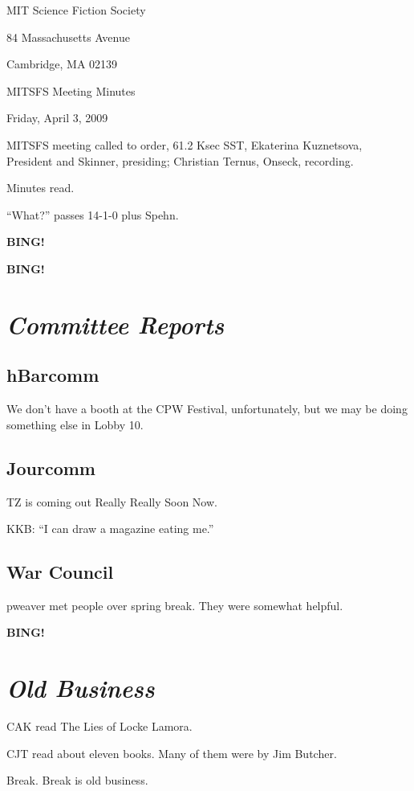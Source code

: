 \documentclass[10pt]{article}
\newcommand{\bing}{{\bf BING!} }
\newcommand{\goto}[1]{\bing \vskip 12pt \section*{{\em{#1}}}}
\newcommand{\ps}{ plus Spehn\xspace}
\begin{document}
\begin{center}

MIT Science Fiction Society

84 Massachusetts Avenue

Cambridge, MA 02139

\vspace{12pt}

MITSFS Meeting Minutes

Friday, April 3, 2009

\end{center}

\vspace{18pt}

\setlength{\parskip}{6pt}

\noindent
MITSFS meeting called to order, 61.2 Ksec SST,
Ekaterina Kuznetsova, President and Skinner, presiding; Christian Ternus, Onseck, recording.

Minutes read.

``What?'' passes 14-1-0 \ps.

\bing

\goto{Committee Reports}

\subsection*{hBarcomm}

We don't have a booth at the CPW Festival, unfortunately, but we may
be doing something else in Lobby 10.

\subsection*{Jourcomm}

TZ is coming out Really Really Soon Now.

KKB: ``I can draw a magazine eating me.''

\subsection*{War Council}

pweaver met people over spring break.  They were somewhat helpful.

\goto{Old Business}

CAK read The Lies of Locke Lamora.

CJT read about eleven books.  Many of them were by Jim Butcher.

Break.  Break is old business.
\end{document}
